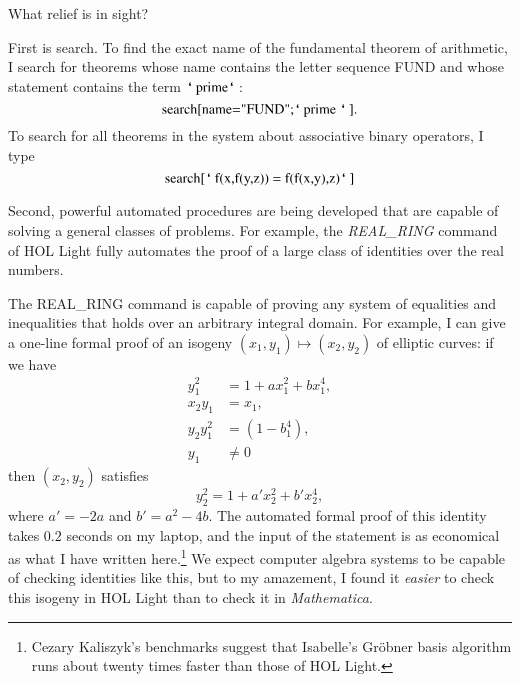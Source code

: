 \documentclass{llncs}
\newcommand{\ring}[1]{\mathbb{#1}}
\def\bq{\text{\tt {`}\,}}
\begin{document}

What relief is in sight?

First is search.  To find the exact name of the fundamental
theorem of arithmetic, I search for theorems whose name contains the
letter sequence FUND and whose statement contains the term $\bq\text{prime}\bq$:
\[
\text{search[name="FUND";\bq prime \bq]}.
\]
To search for all theorems in the system about associative binary operators, I type
\[
\text{search[\bq f(x,f(y,z)) = f(f(x,y),z)\bq]}
\]

Second, powerful automated procedures are being developed that are
capable of solving a general classes of problems.  For example, the
{\it REAL\_RING} command of HOL Light fully automates the proof of a
large class of identities over the real numbers.

The {REAL\_RING} command is capable of proving any system of
equalities and inequalities that holds over an arbitrary integral
domain.  For example, I can give a one-line formal proof of an isogeny
$(x_1,y_1) \mapsto (x_2,y_2)$ of elliptic curves: if we have
\begin{align*}
y_1^2 &= 1 + a x_1^2 + b x_1^4,\\
x_2 y_1&=x_1,\\
y_2 y_1^2&=(1 - b_1^4),\\
y_1&\ne 0
\end{align*}
then $(x_2,y_2)$ satisfies
\[
y_2^2 = 1 + a' x_2^2 + b' x_2^4,
\]
where $a' = -2a$ and $b' = a^2 - 4b$.  The automated formal proof of
this identity takes $0.2$ seconds on my laptop, and the input of the
statement is as economical as what I have written here.\footnote{
  Cezary Kaliszyk's benchmarks suggest that Isabelle's Gr\"obner basis algorithm
  runs about twenty times faster than those of HOL Light.
}  We expect computer
algebra systems to be capable of checking identities like this, but to
my amazement, I found it {\it easier} to check this isogeny in HOL
Light than to check it in {\it Mathematica}.
\end{document}
